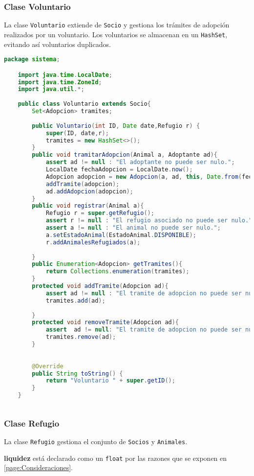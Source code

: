 \subsubsection{Clase Voluntario}\label{codigo:voluntario}
La clase \texttt{Voluntario} extiende de \texttt{Socio} y gestiona los trámites de 
adopción realizados por un voluntario. Los voluntarios se almacenan en un \texttt{HashSet},
evitando así voluntarios duplicados. 
\begin{lstlisting}[style = javaNormal, language=Java] 
    package sistema;

    import java.time.LocalDate;
    import java.time.ZoneId;
    import java.util.*;
    
    public class Voluntario extends Socio{
        Set<Adopcion> tramites;
        
        public Voluntario(int ID, Date date,Refugio r) {
            super(ID, date,r);
            tramites = new HashSet<>();
        }
        public void tramitarAdopcion(Animal a, Adoptante ad){
            assert ad != null : "El adoptante no puede ser nulo.";
            LocalDate fechaAdopcion = LocalDate.now();
            Adopcion adopcion = new Adopcion(a, ad, this, Date.from(fechaAdopcion.atStartOfDay(ZoneId.systemDefault()).toInstant()));
            addTramite(adopcion);
            ad.addAdopcion(adopcion);
        }
        public void registrar(Animal a){
            Refugio r = super.getRefugio();
            assert r != null : "El refugio asociado no puede ser nulo.";
            assert a != null : "El animal no puede ser nulo.";
            a.setEstadoAnimal(EstadoAnimal.DISPONIBLE);
            r.addAnimalesRefugiados(a);
    
        }
        public Enumeration<Adopcion> getTramites(){
            return Collections.enumeration(tramites);
        }
        protected void addTramite(Adopcion ad){
            assert ad != null : "El tramite de adopcion no puede ser nulo.";
            tramites.add(ad);
    
        }
        protected void removeTramite(Adopcion ad){
            assert  ad != null: "El tramite de adopcion no puede ser nulo.";
            tramites.remove(ad);
        }
    
    
        @Override
        public String toString() {
            return "Voluntario " + super.getID();
        }
    }
    
\end{lstlisting}

\subsubsection{Clase Refugio}\label{codigo:refugio}
La clase \texttt{Refugio} gestiona el conjunto de \texttt{Socios} y \texttt{Animales}.\par
\textbf{liquidez} está declarado como un \texttt{float} por las razones que se exponen en \ref{page:Consideraciones}.


